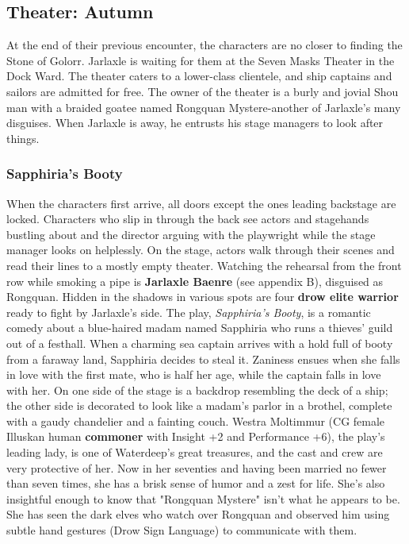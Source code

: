 \documentclass[10pt,a4paper,twoside,twocolumn,openany,nodeprecatedcode]{dndbook}
\begin{document}
\subsection{Theater: Autumn}
At the end of their previous encounter, the characters are no closer to finding the Stone of Golorr. Jarlaxle is waiting for them at the Seven Masks Theater in the Dock Ward. The theater caters to a lower-class clientele, and ship captains and sailors are admitted for free. The owner of the theater is a burly and jovial Shou man with a braided goatee named Rongquan Mystere-another of Jarlaxle's many disguises. When Jarlaxle is away, he entrusts his stage managers to look after things.
\subsubsection{Sapphiria's Booty}
When the characters first arrive, all doors except the ones leading backstage are locked. Characters who slip in through the back see actors and stagehands bustling about and the director arguing with the playwright while the stage manager looks on helplessly. On the stage, actors walk through their scenes and read their lines to a mostly empty theater. Watching the rehearsal from the front row while smoking a pipe is \textbf{Jarlaxle Baenre} (see appendix B), disguised as Rongquan. Hidden in the shadows in various spots are four \textbf{drow elite warrior} ready to fight by Jarlaxle's side.
The play, \textit{Sapphiria's Booty}, is a romantic comedy about a blue-haired madam named Sapphiria who runs a thieves' guild out of a festhall. When a charming sea captain arrives with a hold full of booty from a faraway land, Sapphiria decides to steal it. Zaniness ensues when she falls in love with the first mate, who is half her age, while the captain falls in love with her. On one side of the stage is a backdrop resembling the deck of a ship; the other side is decorated to look like a madam's parlor in a brothel, complete with a gaudy chandelier and a fainting couch.
Westra Moltimmur (CG female Illuskan human \textbf{commoner} with Insight +2 and Performance +6), the play's leading lady, is one of Waterdeep's great treasures, and the cast and crew are very protective of her. Now in her seventies and having been married no fewer than seven times, she has a brisk sense of humor and a zest for life. She's also insightful enough to know that "Rongquan Mystere" isn't what he appears to be. She has seen the dark elves who watch over Rongquan and observed him using subtle hand gestures (Drow Sign Language) to communicate with them.
\end{document}

